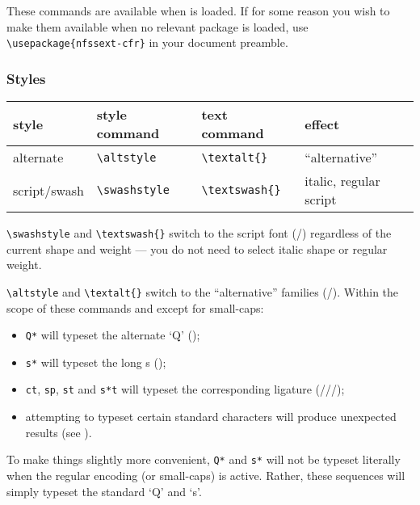 \documentclass[11pt,british]{article}
\begin{document}
These commands are available when  is loaded. If for some reason you wish to make them available when no relevant package is loaded, use \verb|\usepackage{nfssext-cfr}| in your document preamble.
	
\subsubsection{Styles}

	\begin{longtable}{llll}
		\toprule
		\textbf{style}			&	\textbf{style command}	&	\textbf{text command}	&	\textbf{effect}\\\midrule\endhead
		\bottomrule\endfoot
		alternate					&	\verb|\altstyle|					&	\verb|\textalt{}|					&	``alternative''\\
		script/swash				&	\verb|\swashstyle|				&	\verb|\textswash{}|			&	italic, regular script\\
	\end{longtable}
	
	\verb|\swashstyle| and \verb|\textswash{}| switch to the script font (/) regardless of the current shape and weight --- you do not need to select italic shape or regular weight.
	
	\verb|\altstyle| and \verb|\textalt{}| switch to the ``alternative'' families (/). Within the scope of these commands and except for small-caps:
	\begin{itemize}
		\item \verb|Q*| will typeset the alternate `Q' ();
		\item \verb|s*| will typeset the long s ();
		\item \verb|ct|, \verb|sp|, \verb|st| and \verb|s*t| will typeset the corresponding ligature (///);
		\item attempting to typeset certain standard characters will produce unexpected results (see ).
	\end{itemize}
	
	To make things slightly more convenient, \verb|Q*| and \verb|s*| will not be typeset literally when the regular encoding (or small-caps) is active. Rather, these sequences will simply typeset the standard `Q' and `s'.
	
\end{document}
